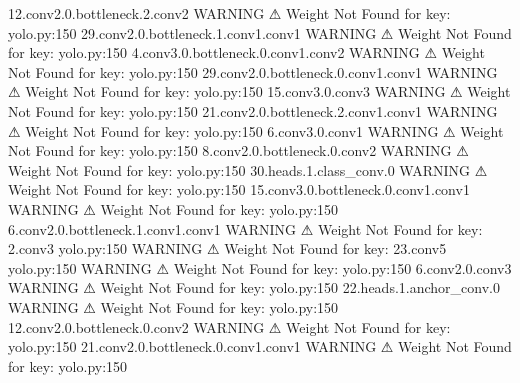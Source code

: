                              12.conv2.0.bottleneck.2.conv2                        
                    WARNING  ⚠ Weight Not Found for key:               yolo.py:150
                             29.conv2.0.bottleneck.1.conv1.conv1                  
                    WARNING  ⚠ Weight Not Found for key:               yolo.py:150
                             4.conv3.0.bottleneck.0.conv1.conv2                   
                    WARNING  ⚠ Weight Not Found for key:               yolo.py:150
                             29.conv2.0.bottleneck.0.conv1.conv1                  
                    WARNING  ⚠ Weight Not Found for key:               yolo.py:150
                             15.conv3.0.conv3                                     
                    WARNING  ⚠ Weight Not Found for key:               yolo.py:150
                             21.conv2.0.bottleneck.2.conv1.conv1                  
                    WARNING  ⚠ Weight Not Found for key:               yolo.py:150
                             6.conv3.0.conv1                                      
                    WARNING  ⚠ Weight Not Found for key:               yolo.py:150
                             8.conv2.0.bottleneck.0.conv2                         
                    WARNING  ⚠ Weight Not Found for key:               yolo.py:150
                             30.heads.1.class_conv.0                              
                    WARNING  ⚠ Weight Not Found for key:               yolo.py:150
                             15.conv3.0.bottleneck.0.conv1.conv1                  
                    WARNING  ⚠ Weight Not Found for key:               yolo.py:150
                             6.conv2.0.bottleneck.1.conv1.conv1                   
                    WARNING  ⚠ Weight Not Found for key: 2.conv3       yolo.py:150
                    WARNING  ⚠ Weight Not Found for key: 23.conv5      yolo.py:150
                    WARNING  ⚠ Weight Not Found for key:               yolo.py:150
                             6.conv2.0.conv3                                      
                    WARNING  ⚠ Weight Not Found for key:               yolo.py:150
                             22.heads.1.anchor_conv.0                             
                    WARNING  ⚠ Weight Not Found for key:               yolo.py:150
                             12.conv2.0.bottleneck.0.conv2                        
                    WARNING  ⚠ Weight Not Found for key:               yolo.py:150
                             21.conv2.0.bottleneck.0.conv1.conv1                  
                    WARNING  ⚠ Weight Not Found for key:               yolo.py:150
